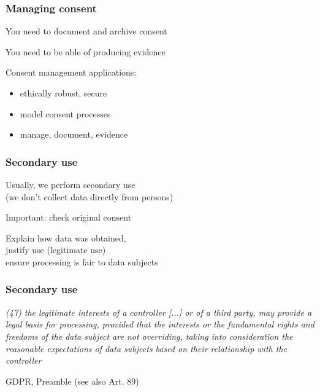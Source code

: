 \documentclass[17pt,aspectratio=169,hyperref={pdfusetitle,colorlinks,allcolors=olive}]{beamer}
\begin{document}
\begin{frame}[fragile]
  \frametitle{Managing consent}

  You need to document and archive consent

  You need to be able of producing evidence

  Consent management applications:

  \begin{itemize}
  \item ethically robust, secure
  \item model consent processes
  \item manage, document, evidence
  \end{itemize}
\end{frame}

\begin{frame}[fragile]
  \frametitle{Secondary use}

  Usually, we perform secondary use \\
  (we don't collect data directly from persons) \\

  \vspace{.5cm}

  Important: check original consent \\

  \vspace{.5cm}

  Explain how data was obtained, \\
  justify use (legitimate use) \\
  ensure processing is fair to data subjects \\
\end{frame}

\begin{frame}[fragile]
  \frametitle{Secondary use}


  {\em
    (47) the legitimate interests of a controller [...] or of a third party, may provide a legal basis for processing, provided that  the  interests  or  the  fundamental  rights  and  freedoms  of  the  data  subject  are  not  overriding,  taking into  consideration  the  reasonable  expectations  of  data  subjects  based  on  their  relationship  with  the controller
  }

  \begin{flushright}
    GDPR, Preamble (see also Art. 89)
  \end{flushright}
\end{frame}
\end{document}
